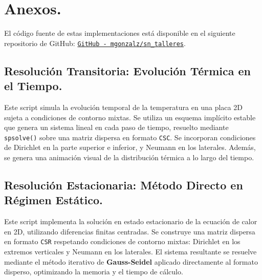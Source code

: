 \documentclass{article}
\begin{document}
\newpage
\section{Anexos.}
El código fuente de estas implementaciones está disponible en el siguiente repositorio de GitHub:  
\href{https://github.com/mgonzalz/sn_talleres/blob/main/notebooks/informe-02__ecuacion-calor.ipynb}{\texttt{GitHub - mgonzalz/sn\_talleres}}.
\subsection{Resolución Transitoria: Evolución Térmica en el Tiempo.}
Este script simula la evolución temporal de la temperatura en una placa 2D sujeta a condiciones de contorno mixtas. Se utiliza un esquema implícito estable que genera un sistema lineal en cada paso de tiempo, resuelto mediante \texttt{spsolve()} sobre una matriz dispersa en formato \texttt{CSC}. Se incorporan condiciones de Dirichlet en la parte superior e inferior, y Neumann en los laterales. Además, se genera una animación visual de la distribución térmica a lo largo del tiempo.



\newpage
\subsection{Resolución Estacionaria: Método Directo en Régimen Estático.}
Este script implementa la solución en estado estacionario de la ecuación de calor en 2D, utilizando diferencias finitas centradas. Se construye una matriz dispersa en formato \texttt{CSR} respetando condiciones de contorno mixtas: Dirichlet en los extremos verticales y Neumann en los laterales. El sistema resultante se resuelve mediante el método iterativo de \textbf{Gauss-Seidel} aplicado directamente al formato disperso, optimizando la memoria y el tiempo de cálculo.


\end{document}
